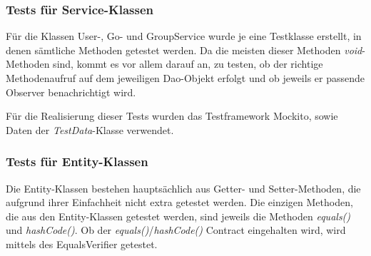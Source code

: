 \documentclass[11pt,a4paper]{scrartcl}
\begin{document}
\subsubsection{Tests für Service-Klassen}
Für die Klassen User-, Go- und GroupService wurde je eine Testklasse erstellt, in denen sämtliche Methoden getestet werden. Da die meisten dieser Methoden \textit{void}-Methoden sind, kommt es vor allem darauf an, zu testen, ob der richtige Methodenaufruf auf dem jeweiligen Dao-Objekt erfolgt und ob jeweils er passende Observer benachrichtigt wird.

Für die Realisierung dieser Tests wurden das Testframework Mockito, sowie Daten der \textit{TestData}-Klasse verwendet.

\subsubsection{Tests für Entity-Klassen}
Die Entity-Klassen bestehen hauptsächlich aus Getter- und Setter-Methoden, die aufgrund ihrer Einfachheit nicht extra getestet werden. Die einzigen Methoden, die aus den Entity-Klassen getestet werden, sind jeweils die Methoden \textit{equals()} und \textit{hashCode()}. Ob der \textit{equals()}/\textit{hashCode()} Contract eingehalten wird, wird mittels des EqualsVerifier getestet.
\end{document}
